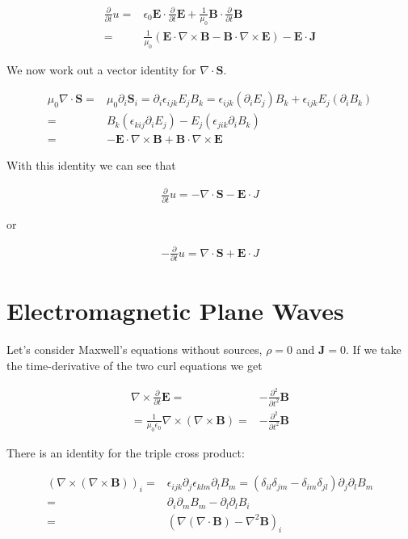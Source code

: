 \documentclass[12pt]{article}
\newcommand{\ep}{\epsilon}
\renewcommand{\vec}[1]{\boldsymbol{#1}}
\begin{document}
\begin{align}
\frac{\partial}{\partial t}u =& \ep_0 \vec{E} \cdot \frac{\partial}{\partial t}\vec{E} + \frac{1}{\mu_0} \vec{B}\cdot \frac{\partial}{\partial t}\vec{B}\\
=& \frac{1}{\mu_0} \left(\vec{E} \cdot \nabla \times \vec{B} - \vec{B} \cdot \nabla \times \vec{E}\right) - \vec{E}\cdot\vec{J}
\end{align}

We now work out a vector identity for $\nabla \cdot \vec{S}$.

\begin{align}
\mu_0\nabla \cdot \vec{S} =& \mu_0\partial_i \vec{S}_i = \partial_i \ep_{ijk} E_j B_k = \ep_{ijk} (\partial_i E_j)B_k + \ep_{ijk} E_j (\partial_i B_k)\\
=& B_k(\epsilon_{kij} \partial_i E_j) - E_j(\epsilon_{jik} \partial_i B_k)\\
=& -\vec{E}\cdot \nabla \times \vec{B} + \vec{B}\cdot \nabla\times \vec{E}
\end{align}

With this identity we can see that

\begin{align}
\frac{\partial}{\partial t}u = -\nabla\cdot \vec{S} -\vec{E}\cdot{J}
\end{align}

or

\begin{align}
-\frac{\partial}{\partial t}u = \nabla \cdot \vec{S} + \vec{E}\cdot{J}
\end{align}

\section{Electromagnetic Plane Waves}

Let's consider Maxwell's equations without sources, $\rho =0$ and $\vec{J}=0$.
If we take the time-derivative of the two curl equations we get

\begin{align}
\nabla \times \frac{\partial}{\partial t}\vec{E} =& -\frac{\partial^2}{\partial t^2} \vec{B}\\
= \frac{1}{\mu_0 \ep_0} \nabla \times\left(\nabla \times \vec{B}\right) =& -\frac{\partial^2}{\partial t^2}\vec{B}
\end{align}

There is an identity for the triple cross product:

\begin{align}
\left(\nabla \times\left(\nabla\times\vec{B}\right)\right)_i =& \ep_{ijk} \partial_j \ep_{klm}\partial_l B_m = (\delta_{il}\delta_{jm} - \delta_{im}\delta_{jl}) \partial_j \partial_l B_m\\
=& \partial_i \partial_m B_m - \partial_l \partial_l B_i\\
=&  \left(\nabla(\nabla \cdot \vec{B}) - \nabla^2 \vec{B}\right)_i
\end{align}
\end{document}
